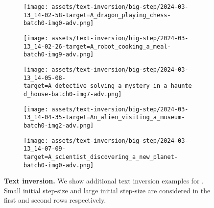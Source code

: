 \begin{figure*}[h]
\vspace{1ex}
\begin{minipage}[t]{.025\textwidth}
     \vspace{0pt}
\end{minipage}%
\hspace{1ex}
\begin{minipage}[t]{0.98\figwidth}
    \vspace{0pt}
    \begin{subfigure}[t]{0.2\textwidth}
        \texttt{[image: assets/text-inversion/big-step/2024-03-13\_14-02-58-target=A\_dragon\_playing\_chess-batch0-img0-adv.png]}
    \end{subfigure}%
    \begin{subfigure}[t]{0.2\textwidth}
        \texttt{[image: assets/text-inversion/big-step/2024-03-13\_14-02-26-target=A\_robot\_cooking\_a\_meal-batch0-img9-adv.png]}
    \end{subfigure}%
    \begin{subfigure}[t]{0.2\textwidth}
        \texttt{[image: assets/text-inversion/big-step/2024-03-13\_14-05-08-target=A\_detective\_solving\_a\_mystery\_in\_a\_haunted\_house-batch0-img7-adv.png]}
    \end{subfigure}%
    \begin{subfigure}[t]{0.2\textwidth}
        \texttt{[image: assets/text-inversion/big-step/2024-03-13\_14-04-35-target=An\_alien\_visiting\_a\_museum-batch0-img2-adv.png]}
    \end{subfigure}%
    \begin{subfigure}[t]{0.2\textwidth}
        \texttt{[image: assets/text-inversion/big-step/2024-03-13\_14-07-09-target=A\_scientist\_discovering\_a\_new\_planet-batch0-img0-adv.png]}
    \end{subfigure}%
\end{minipage}

\caption{\textbf{Text inversion.} We show additional text inversion examples for \rclip. Small initial step-size and large initial step-size are considered in the first and second rows respectively.
}
\label{fig:text-inv-app}
\end{figure*}